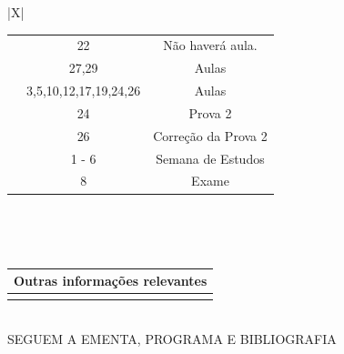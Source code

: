 \documentclass[11pt,a4paper,ssfamily]{exam}                                        %
\begin{document}
\begin{center}
\begin{tabularx}{\textwidth}{|X|}
\begin{minipage}[t]{0.95\columnwidth}
{\begin{center}
\begin{tabular}{ccc}
 & 22      & Não haverá aula.\\
 & 27,29   &  Aulas  \\ 
\hline
\multirow{3}{15mm}{\rotatebox{0}{\mbox{Junho}}}  &
   3,5,10,12,17,19,24,26   &  Aulas   \\
 & 24      &  Prova 2   \\
 & 26      &  Correção da Prova 2 \\ 
\hline
\multirow{2}{15mm}{\rotatebox{0}{\mbox{Julho}}}  &
   1 - 6      &  Semana de Estudos   \\
 & 8      &  Exame  \\
\hline
\end{tabular}\end{center}
}\end{minipage}\vspace{0.1cm}\\                                                    %
\hline                                                                             %
\end{tabularx}\\                                                                   %
\vspace{0.5cm}                                                                     %
\begin{tabularx}{\textwidth}{|X|}                                                  %
\hline                                                                             %
\cellcolor{lightgray}\textbf{Outras informações relevantes} \\                     %
\hline                                                                             %
\begin{minipage}[t]{0.95\columnwidth}\vspace{0.1cm}\small{                         %

}\end{minipage}\vspace{0.1cm}\\                                                    %
\hline                                                                             %
\end{tabularx}\\                                                                   %
\vspace{0.5cm}                                                                     %
SEGUEM A EMENTA, PROGRAMA E BIBLIOGRAFIA                                           %

\end{center}
\end{document}
